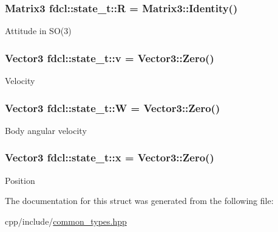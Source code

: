 \subsubsection[{\texorpdfstring{R}{R}}]{\setlength{\rightskip}{0pt plus 5cm}Matrix3 fdcl\+::state\+\_\+t\+::R = Matrix3\+::\+Identity()}\hypertarget{structfdcl_1_1state__t_ae23467816c212658b7bd780c6a43a364}{}\label{structfdcl_1_1state__t_ae23467816c212658b7bd780c6a43a364}
Attitude in S\+O(3) 
\subsubsection[{\texorpdfstring{v}{v}}]{\setlength{\rightskip}{0pt plus 5cm}Vector3 fdcl\+::state\+\_\+t\+::v = Vector3\+::\+Zero()}\hypertarget{structfdcl_1_1state__t_a98e6ea57e2ac698c1d86b5101c1c67cc}{}\label{structfdcl_1_1state__t_a98e6ea57e2ac698c1d86b5101c1c67cc}
Velocity 
\subsubsection[{\texorpdfstring{W}{W}}]{\setlength{\rightskip}{0pt plus 5cm}Vector3 fdcl\+::state\+\_\+t\+::W = Vector3\+::\+Zero()}\hypertarget{structfdcl_1_1state__t_a6de6651203fbcc51c85d0b297b405284}{}\label{structfdcl_1_1state__t_a6de6651203fbcc51c85d0b297b405284}
Body angular velocity 
\subsubsection[{\texorpdfstring{x}{x}}]{\setlength{\rightskip}{0pt plus 5cm}Vector3 fdcl\+::state\+\_\+t\+::x = Vector3\+::\+Zero()}\hypertarget{structfdcl_1_1state__t_a302cd41568974e5dac4a5daf005ab57b}{}\label{structfdcl_1_1state__t_a302cd41568974e5dac4a5daf005ab57b}
Position 

The documentation for this struct was generated from the following file\+:\begin{DoxyCompactItemize}
\item 
cpp/include/\hyperlink{common__types_8hpp}{common\+\_\+types.\+hpp}\end{DoxyCompactItemize}
